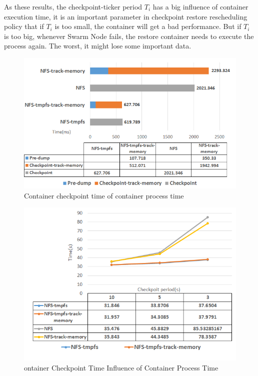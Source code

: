 As these results, the checkpoint-ticker period $ T_i $ has a big influence of container execution time, it is an important parameter in checkpoint restore rescheduling policy that if $ T_i $ is too small, the container will get a bad performance. But if $ T_i $ is too big, whenever Swarm Node fails, the restore container needs to execute the process again. The worst, it might lose some important data.

\begin{figure}[hbtp]
\begin{center}
\includegraphics[width=14cm]{figure/cpu_checkpoint_time.png}
\end{center}
\caption{Container checkpoint time of container process time}
\label{fig:Checkpoint Time CPU}
\end{figure}

\begin{figure}[hbtp]
\begin{center}
\includegraphics[width=14cm]{figure/cpu_checkpoint_period.png}
\end{center}
\caption{ontainer Checkpoint Time Influence of Container Process Time}
\label{fig:Checkpoint Time Influence CPU}
\end{figure}

